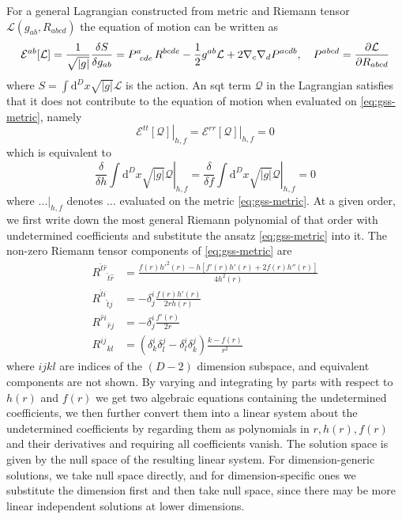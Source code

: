 \documentclass[a4paper,11pt]{article}
\newcommand{\dd}{{\mathrm d}}
\begin{document}
For a general Lagrangian constructed from metric and Riemann tensor $\mathcal L(g_{ab}, R_{abcd})$ the equation of motion can be written as \cite{lanczos-lovelock}
\begin{equation}
    \mathcal E^{ab}[\mathcal L] = \frac{1}{\sqrt{|g|}}\frac{\delta S}{\delta g_{ab}} = P\indices{^a_c_d_e} R^{bcde} - \frac12 g^{ab}\mathcal L + 2\nabla_c\nabla_d P^{acdb},
    \quad P^{abcd} = \frac{\partial\mathcal L}{\partial R_{abcd}}
\end{equation}
where $S = \int\dd^D x\sqrt{|g|}\mathcal L$ is the action. An \ac{sqt} term $\mathcal Q$ in the Lagrangian satisfies that it does not contribute to the equation of motion when evaluated on \eqref{eq:gss-metric}, namely
\begin{equation}\label{eq:qtg-cond}
    \left.\mathcal E^{tt}[\mathcal Q]\right|_{h, f} = \left.\mathcal E^{rr}[\mathcal Q]\right|_{h, f} = 0
\end{equation}
which is equivalent to
\begin{equation}\label{eq:qtg-cond-alt}
    \frac{\delta}{\delta h}\int\dd^D x\left.\sqrt{|g|}\mathcal Q\right|_{h, f} = 
    \frac{\delta}{\delta f}\int\dd^D x\left.\sqrt{|g|}\mathcal Q\right|_{h, f} = 0
\end{equation}
where $\dots |_{h, f}$ denotes $\dots$ evaluated on the metric \eqref{eq:gss-metric}. At a given order, we first write down the most general Riemann polynomial of that order with undetermined coefficients and substitute the ansatz \eqref{eq:gss-metric} into it. The non-zero Riemann tensor components of \eqref{eq:gss-metric} are
\begin{align*}
    R^{\hat t\hat r}{}_{\hat t\hat r} & = \frac{f(r) h'^2(r) - h \left[f'(r) h'(r) + 2 f(r) h''(r)\right]}{4 h^2(r)} \\
    R^{\hat ti}{}_{\hat tj} & = -\delta^i_j \frac{f(r) h'(r)}{2 r h(r)} \\
    R^{\hat ri}{}_{\hat rj} & = -\delta^i_j \frac{f'(r)}{2r} \\
    R^{ij}{}_{kl} & = (\delta^i_k \delta^j_l - \delta^i_l \delta^j_k) \frac{k - f(r)}{r^2}
\end{align*}
where $ijkl$ are indices of the $(D - 2)$ dimension subspace, and equivalent components are not shown. By varying and integrating by parts with respect to $h(r)$ and $f(r)$ we get two algebraic equations containing the undetermined coefficients, we then further convert them into a linear system about the undetermined coefficients by regarding them as polynomials in $r, h(r), f(r)$ and their derivatives and requiring all coefficients vanish. The solution space is given by the null space of the resulting linear system. For dimension-generic solutions, we take null space directly, and for dimension-specific ones we substitute the dimension first and then take null space, since there may be more linear independent solutions at lower dimensions.
\end{document}
